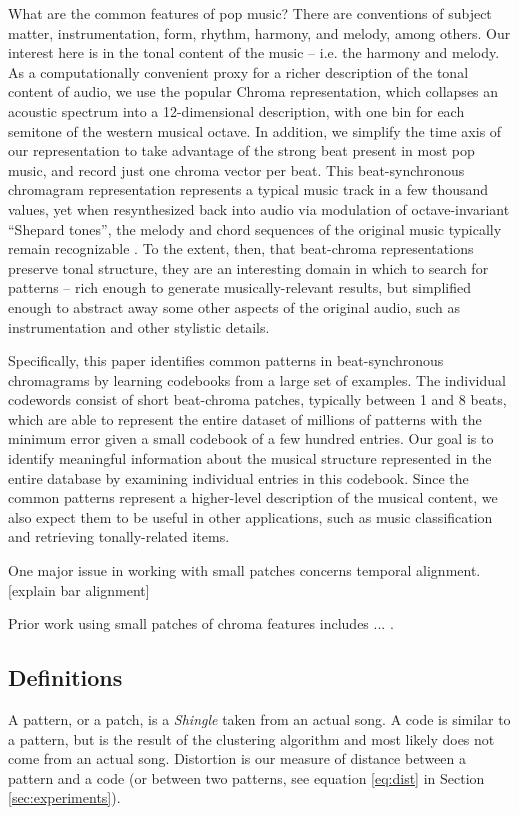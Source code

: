 \documentclass{article}
\begin{document}
What are the common features of pop music?  There are conventions
of subject matter, instrumentation, form, rhythm, harmony, and melody, among
others.  Our interest here is in the tonal content of the music -- i.e. the
harmony and melody.  As a computationally convenient proxy for a richer
description of the tonal content of audio, we use the popular Chroma
representation, which collapses an acoustic spectrum into a 12-dimensional
description, with one bin for each semitone of the western musical octave.
In addition, we simplify the time axis of our representation to take advantage
of the strong beat present in most pop music, and record just one
chroma vector per beat.  This beat-synchronous chromagram
representation represents a typical music track
in a few thousand values, yet when resynthesized back into audio via
modulation of octave-invariant ``Shepard tones'', the melody and
chord sequences of the original music typically remain recognizable
\cite{Ellis2007a}.  To the extent, then, that beat-chroma
representations preserve tonal structure, they
are an interesting domain in which to search for patterns -- rich enough
to generate musically-relevant results, but simplified enough to
abstract away some other aspects of the original audio, such as
instrumentation and other stylistic details.

Specifically, this paper identifies common patterns in beat-synchronous
chromagrams by learning codebooks from a large set of examples.
The individual codewords consist of short beat-chroma patches, typically
between 1 and 8 beats, which are able to represent the entire dataset
of millions of patterns with the minimum error given a small codebook of
a few hundred entries.  Our goal is to identify meaningful information
about the musical structure represented in the entire database by
examining individual entries in this codebook.  Since the common
patterns represent a higher-level description of the musical content,
we also expect them to be useful in other applications, such as
music classification and retrieving tonally-related items.

One major issue in working with small patches concerns temporal
alignment.  [explain bar alignment]

Prior work using small patches of chroma features includes ...
\cite{Casey2006,Ellis2007,Ellis2007a}.



\subsection{Definitions}
A pattern, or a patch, is a \textit{Shingle} taken from an actual song.
A code is similar to a pattern, but is the result of the clustering
algorithm and most likely does not come from an actual song.
Distortion is our measure of distance between a pattern and a code
(or between two patterns, see equation \ref{eq:dist} in Section 
\ref{sec:experiments}).
\end{document}
